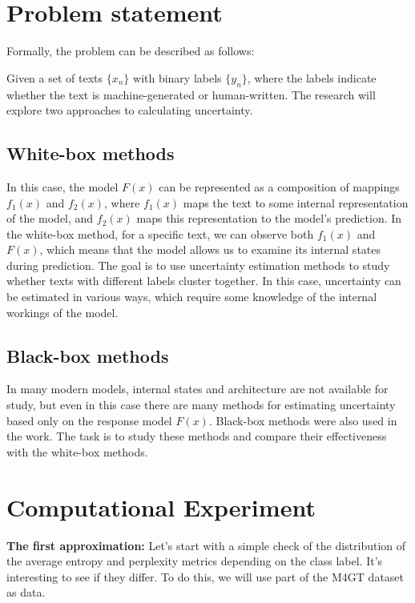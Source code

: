 \documentclass[a4paper, 12pt]{article}
\begin{document}
\section{Problem statement}

Formally, the problem can be described as follows:  

Given a set of texts \(\{x_n\}\) with binary labels \(\{y_n\}\), where the labels indicate whether the text is machine-generated or human-written. The research will explore two approaches to calculating uncertainty.

\subsection {White-box methods}  
In this case, the model \(F(x)\) can be represented as a composition of mappings \(f_1(x)\) and \(f_2(x)\), where \(f_1(x)\) maps the text to some internal representation of the model, and \(f_2(x)\) maps this representation to the model's prediction. In the white-box method, for a specific text, we can observe both \(f_1(x)\) and \(F(x)\), which means that the model allows us to examine its internal states during prediction. The goal is to use uncertainty estimation methods to study whether texts with different labels cluster together. In this case, uncertainty can be estimated in various ways\citep{Polygraph}, which require some knowledge of the internal workings of the model. 

\subsection {Black-box methods}   
In many modern models, internal states and architecture are not available for study, but even in this case there are many methods for estimating uncertainty based only on the response model \(F(x)\). Black-box methods were also used in the work\citep{Polygraph}. The task is to study these methods and compare their effectiveness with the white-box methods.

\section{Computational Experiment}

\textbf{The first approximation:} Let's start with a simple check of the distribution of the average entropy and perplexity metrics depending on the class label. It's interesting to see if they differ.  To do this, we will use part of the M4GT\citep{wang2024m4gt} dataset as data. 
\end{document}
